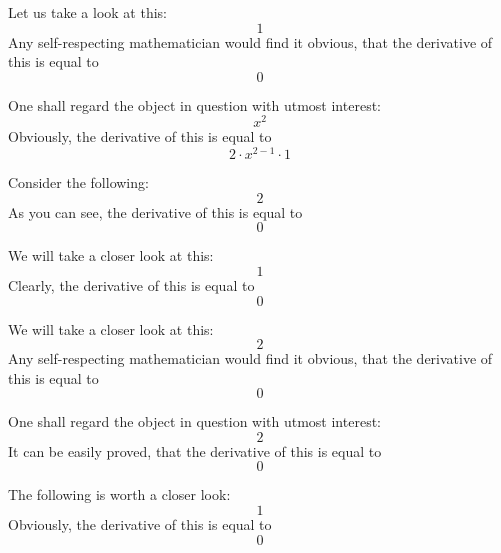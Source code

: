 \documentclass{article}
\begin{document}
Let us take a look at this:
\begin{equation}
1 
\end{equation}
Any self-respecting mathematician would find it obvious, that the derivative of this is equal to
\begin{equation}
0 
\end{equation}

One shall regard the object in question with utmost interest:
\begin{equation}
x ^{2 } 
\end{equation}
Obviously, the derivative of this is equal to
\begin{equation}
2 \cdot x ^{2 - 1 } \cdot 1 
\end{equation}

Consider the following:
\begin{equation}
2 
\end{equation}
As you can see, the derivative of this is equal to
\begin{equation}
0 
\end{equation}

We will take a closer look at this:
\begin{equation}
1 
\end{equation}
Clearly, the derivative of this is equal to
\begin{equation}
0 
\end{equation}

We will take a closer look at this:
\begin{equation}
2 
\end{equation}
Any self-respecting mathematician would find it obvious, that the derivative of this is equal to
\begin{equation}
0 
\end{equation}

One shall regard the object in question with utmost interest:
\begin{equation}
2 
\end{equation}
It can be easily proved, that the derivative of this is equal to
\begin{equation}
0 
\end{equation}

The following is worth a closer look:
\begin{equation}
1 
\end{equation}
Obviously, the derivative of this is equal to
\begin{equation}
0 
\end{equation}
\end{document}
